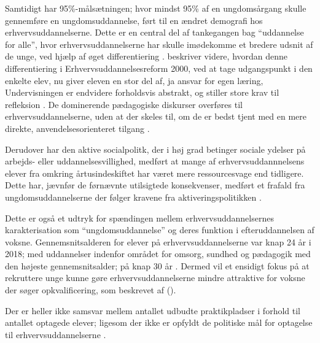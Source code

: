 Samtidigt har 95\%-målsætningen; hvor mindst 95\% af en ungdomsårgang skulle gennemføre en ungdomsuddannelse, ført til en ændret demografi hos erhvervsuddannelserne.
Dette er en central del af tankegangen bag “uddannelse for alle”, hvor erhvervsuddannelserne har skulle imødekomme et bredere udsnit af de unge, ved hjælp af øget differentiering \autocite[s. 365f]{aarkrogRummelighedOgSammenhaeng2003}.
\citeauthor{aarkrogRummelighedOgSammenhaeng2003} beskriver videre, hvordan denne differentiering i Erhvervsuddannelsesreform 2000, ved at tage udgangspunkt i den enkelte elev, nu giver eleven en  stor del af, ja ansvar for egen læring, Undervisningen er endvidere forholdsvis abstrakt, og stiller store krav til refleksion \citeyear[s. 367f]{aarkrogRummelighedOgSammenhaeng2003}.
De dominerende pædagogiske diskurser overføres til erhvervsuddannelserne, uden at der skeles til, om de er bedst tjent med en mere direkte, anvendelsesorienteret tilgang \autocite[s. 370f]{aarkrogRummelighedOgSammenhaeng2003}.

Derudover har den aktive socialpolitk, der i høj grad betinger sociale ydelser på arbejds- eller uddannelsesvillighed, medført at mange af erhvervsuddannnelsens elever fra omkring årtusindeskiftet har været mere ressourcesvage end tidligere.
Dette har, jævnfør de førnævnte utilsigtede konsekvenser, medført et frafald fra ungdomsuddannelserne der følger kravene fra aktiveringspolitikken \autocite[s.13]{jorgensenReformenAfErhvervsuddannelserne2016}.

Dette er også et udtryk for spændingen mellem erhvervsuddannelsernes karakterisation som “ungdomsuddannelse” og deres funktion i efteruddannelsen af voksne.
Gennemsnitsalderen for elever på erhvervsuddannelserne var knap 24 år i 2018; med uddannelser indenfor området for omsorg, sundhed og pædagogik med den højeste gennemsnitsalder; på knap 30 år \autocite[s. 14]{danmarksstatistikErhvervsuddannelserDanmark20192019}.
Dermed vil et ensidigt fokus på at rekruttere unge kunne gøre erhvervsuddannelserne mindre attraktive for voksne der søger opkvalificering, som beskrevet af \citeauthor{jorgensenReformenAfErhvervsuddannelserne2016} (\citeyear[s. 13]{jorgensenReformenAfErhvervsuddannelserne2016}).

Der er heller ikke samsvar mellem antallet udbudte praktikpladser i forhold til antallet optagede elever; ligesom der ikke er opfyldt de politiske mål for optagelse til erhvervsuddannelserne \autocite[s. 10]{danmarksstatistikErhvervsuddannelserDanmark20192019}.
